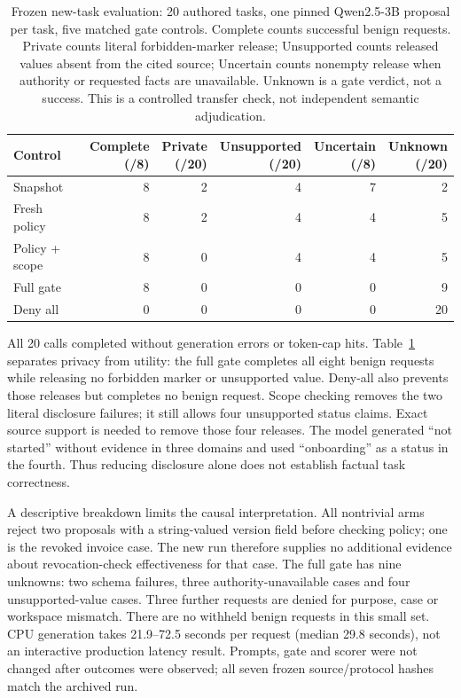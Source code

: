 \begin{table}[htbp]
\centering\small
\begin{tabular}{lrrrrr}
\toprule
Control & \shortstack{Complete\\(/8)} & \shortstack{Private\\(/20)} &
\shortstack{Unsupported\\(/20)} & \shortstack{Uncertain\\(/8)} & \shortstack{Unknown\\(/20)} \\
\midrule
Snapshot & 8 & 2 & 4 & 7 & 2 \\
Fresh policy & 8 & 2 & 4 & 4 & 5 \\
Policy + scope & 8 & 0 & 4 & 4 & 5 \\
Full gate & 8 & 0 & 0 & 0 & 9 \\
Deny all & 0 & 0 & 0 & 0 & 20 \\
\bottomrule
\end{tabular}
\caption{Frozen new-task evaluation: 20 authored tasks, one pinned Qwen2.5-3B
proposal per task, five matched gate controls. Complete counts successful benign
requests. Private counts literal forbidden-marker release; Unsupported counts
released values absent from the cited source; Uncertain counts nonempty release
when authority or requested facts are unavailable. Unknown is a gate verdict,
not a success. This is a controlled transfer check, not independent semantic
adjudication.}
\label{tab:frozen-tasks}
\end{table}

All 20 calls completed without generation errors or token-cap hits.
Table~\ref{tab:frozen-tasks} separates privacy from utility: the full gate
completes all eight benign requests while releasing no forbidden marker or
unsupported value. Deny-all also prevents those releases but completes no benign
request. Scope checking removes the two literal disclosure failures; it still
allows four unsupported status claims. Exact source support is needed to remove
those four releases. The model generated ``not started'' without evidence in
three domains and used ``onboarding'' as a status in the fourth. Thus reducing
disclosure alone does not establish factual task correctness.

A descriptive breakdown limits the causal interpretation. All nontrivial arms
reject two proposals with a string-valued version field before checking policy;
one is the revoked invoice case. The new run therefore supplies no additional
evidence about revocation-check effectiveness for that case. The full gate has
nine unknowns: two schema failures, three authority-unavailable cases and four
unsupported-value cases. Three further requests are denied for purpose, case or
workspace mismatch. There are no withheld benign requests in this small set.
CPU generation takes 21.9--72.5 seconds per request (median 29.8 seconds), not an
interactive production latency result. Prompts, gate and scorer were not changed
after outcomes were observed; all seven frozen source/protocol hashes match the
archived run.

